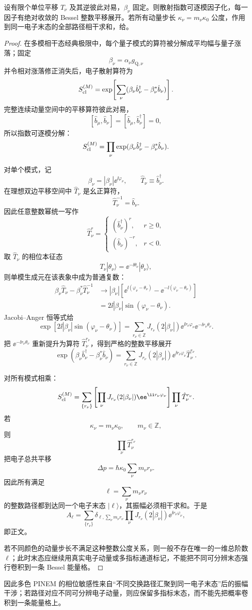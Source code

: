\begin{proposition}
设有限个单位平移 $T_\nu$ 及其逆彼此对易，$\beta_\nu$ 固定。则散射指数可逐模因子化，每一因子有绝对收敛的 Bessel 整数平移展开。若所有动量步长 $\kappa_\nu=m_\nu\kappa_0$ 公度，作用到同一电子末态的全部路径相干求和，给。
\end{proposition}
\begin{proof}
在多模相干态经典极限中，每个量子模式的算符被分解成平均幅与量子涨落；固定
\[
\beta_\nu=\alpha_\nu g_{\mathrm Q,\nu}
\]
并令相对涨落修正消失后，电子散射算符为
\[
S_{\rm cl}^{(M)}
=
\exp\!\left[
\sum_\nu
(\beta_\nu\hat b_\nu^\dagger-\beta_\nu^*\hat b_\nu)
\right].
\]
完整连续动量空间中的平移算符彼此对易，
\[
[\hat b_\mu,\hat b_\nu]=
[\hat b_\mu,\hat b_\nu^\dagger]=0,
\]
所以指数可逐模分解：
\[
S_{\rm cl}^{(M)}
=
\prod_\nu
\exp(
\beta_\nu\hat b_\nu^\dagger
-\beta_\nu^*\hat b_\nu).
\]

对单个模式，记
\[
\beta_\nu=|\beta_\nu|\ee^{\ii\varphi_\nu},
\qquad
\hat T_\nu\equiv\hat b_\nu^\dagger.
\]
在理想双边平移空间中 $\hat T_\nu$ 是幺正算符，
\[
\hat T_\nu^{-1}=\hat b_\nu.
\]
因此任意整数幂统一写作
\[
\hat T_\nu^{r}
=
\begin{cases}
(\hat b_\nu^\dagger)^r,&r\ge0,\\
(\hat b_\nu)^{-r},&r<0.
\end{cases}
\]
取 $\hat T_\nu$ 的相位本征态
\[
\hat T_\nu|\theta_\nu\rangle
=
\ee^{-\ii\theta_\nu}|\theta_\nu\rangle,
\]
则单模生成元在该表象中成为普通复数：
\begin{align*}
\beta_\nu\hat T_\nu-\beta_\nu^*\hat T_\nu^{-1}
&\longrightarrow
|\beta_\nu|
\left[
\ee^{\ii(\varphi_\nu-\theta_\nu)}
-\ee^{-\ii(\varphi_\nu-\theta_\nu)}
\right]\\
&=
2\ii|\beta_\nu|
\sin(\varphi_\nu-\theta_\nu).
\end{align*}
Jacobi--Anger 恒等式给
\[
\exp[
2\ii|\beta_\nu|\sin(\varphi_\nu-\theta_\nu)
]
=
\sum_{r_\nu\in\mathbb Z}
J_{r_\nu}(2|\beta_\nu|)
\ee^{\ii r_\nu\varphi_\nu}
\ee^{-\ii r_\nu\theta_\nu}.
\]
把
$\ee^{-\ii r_\nu\theta_\nu}$
重新提升为算符 $\hat T_\nu^{r_\nu}$，得到严格的整数平移展开
\[
\exp(
\beta_\nu\hat b_\nu^\dagger
-\beta_\nu^*\hat b_\nu)
=
\sum_{r_\nu\in\mathbb Z}
J_{r_\nu}(2|\beta_\nu|)
\ee^{\ii r_\nu\varphi_\nu}
\hat T_\nu^{r_\nu}.
\]

对所有模式相乘：
\[
S_{\rm cl}^{(M)}
=
\sum_{\{r_\nu\}}
\left[
\prod_\nu
J_{r_\nu}(2|\beta_\nu|)
\ee^{\ii r_\nu\varphi_\nu}
\right]
\prod_\nu\hat T_\nu^{r_\nu}.
\]
若
\[
\kappa_\nu=m_\nu\kappa_0,
\qquad
m_\nu\in\mathbb Z,
\]
则
\[
\prod_\nu\hat T_\nu^{r_\nu}
\]
把电子总共平移
\[
\Delta p
=
\hbar\kappa_0
\sum_\nu m_\nu r_\nu.
\]
因此所有满足
\[
\ell=\sum_\nu m_\nu r_\nu
\]
的整数路径都到达同一个电子末态 $|\ell\rangle$，其振幅必须相干求和。于是
\[
A_\ell
=
\sum_{\{r_\nu\}}
\delta_{\ell,\sum_\nu m_\nu r_\nu}
\prod_\nu
J_{r_\nu}(2|\beta_\nu|)
\ee^{\ii r_\nu\varphi_\nu},
\]
即正文。

若不同颜色的动量步长不满足这种整数公度关系，则一般不存在唯一的一维总阶数 $\ell$；此时末态应继续用真实电子动量或多指标通道标记，不能把不同可分辨末态强行卷积到一条 Bessel 能量格。
\end{proof}

因此多色 PINEM 的相位敏感性来自“不同交换路径汇聚到同一电子末态”后的振幅干涉；若路径对应不同可分辨电子动量，则应保留多指标末态，而不能先把概率卷积到一条能量格上。
